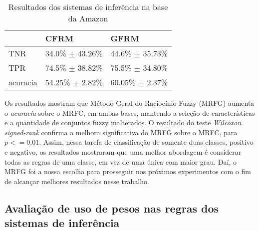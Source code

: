 \documentclass[template.tex]{subfiles}
\begin{document}
%
%
%

\begin{table}[!h]
    \begin{tabular}{lll}
    ~                   & CFRM                                  & GFRM \\ \hline
    TNR                 & 34.0\% $\pm$ 43.26\%      & 44.6\% $\pm$ 35.73\%    \\
    TPR             & 74.5\% $\pm$ 38.82\%      & 75.5\% $\pm$ 34.80\%    \\
    acuracia        & 54.25\% $\pm$ 2.82\%      & 60.05\% $\pm$ 2.37\%   \\
    \end{tabular}
    \caption{Resultados dos sistemas de inferência na base da Amazon}
    \label{table:amazon2}
\end{table}

%
%
%

Os resultados mostram que Método Geral do Raciocínio Fuzzy (MRFG) aumenta o \textit{acuracia} sobre o MRFC, em ambas bases,  mantendo a seleção de características e a quantidade de conjuntos fuzzy inalterados. O resultado do teste \textit{Wilcoxon signed-rank} confirma a melhora significativa do MRFG sobre o MRFC, para $p <= 0.01$. Assim, nessa tarefa de classificação de somente duas classes, positivo e negativo, os resultados mostraram que uma melhor abordagem é considerar todas as regras de uma classe, em vez de uma única com maior grau. Daí, o MRFG foi a nossa escolha para prosseguir nos próximos experimentos com o fim de alcançar melhores resultados nesse trabalho.

\subsection{Avaliação de uso de pesos nas regras dos sistemas de inferência}
\end{document}

